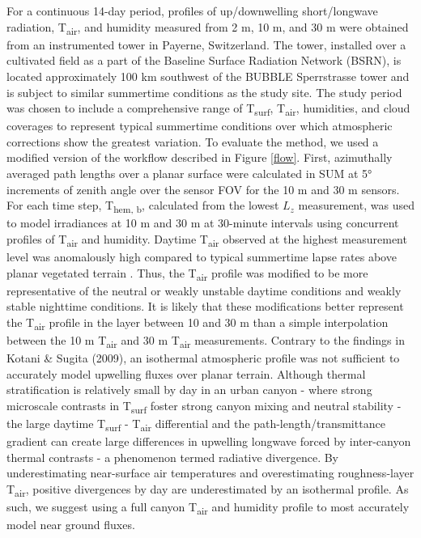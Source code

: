 For a continuous 14-day period, profiles of up/downwelling short/longwave radiation, T\textsubscript{air}, and humidity measured from 2 \si{m}, 10 \si{m}, and 30 \si{m} were obtained from an instrumented tower in Payerne, Switzerland. The tower, installed over a cultivated field as a part of the Baseline Surface Radiation Network (BSRN), is located approximately 100 \si{\kilo\meter} southwest of the BUBBLE Sperrstrasse tower and is subject to similar summertime conditions as the study site. The study period was chosen to include a comprehensive range of T\textsubscript{surf}, T\textsubscript{air}, humidities, and cloud coverages to represent typical summertime conditions over which atmospheric corrections show the greatest variation. To evaluate the method, we used a modified version of the workflow described in Figure \ref{flow}. First, azimuthally averaged path lengths over a planar surface were calculated in SUM at 5\si{\degree} increments of zenith angle over the sensor FOV for the 10 \si{\meter} and 30 \si{\meter} sensors. For each time step, T\textsubscript{hem, b}, calculated from the lowest $L_z$ measurement, was used to model irradiances at 10 \si{m} and 30 \si{m} at 30-minute intervals using concurrent profiles of T\textsubscript{air} and humidity. Daytime T\textsubscript{air} observed at the highest measurement level was anomalously high compared to typical summertime lapse rates above planar vegetated terrain \cite{Oke1987}. Thus, the T\textsubscript{air} profile was modified to be more representative of the neutral or weakly unstable daytime conditions and weakly stable nighttime conditions. It is likely that these modifications better represent the T\textsubscript{air} profile in the layer between 10 and 30 \si{\meter} than a simple interpolation between the 10 \si{\meter} T\textsubscript{air} and 30 \si{\meter} T\textsubscript{air} measurements. Contrary to the findings in Kotani \& Sugita (2009), an isothermal atmospheric profile was not sufficient to accurately model upwelling fluxes over planar terrain. Although thermal stratification is relatively small by day in an urban canyon \cite{Nakamura1988} - where strong microscale contrasts in T\textsubscript{surf} foster strong canyon mixing and neutral stability - the large daytime T\textsubscript{surf} - T\textsubscript{air} differential and the path-length/transmittance gradient can create large differences in upwelling longwave forced by inter-canyon thermal contrasts - a phenomenon termed radiative divergence. By underestimating near-surface air temperatures and overestimating roughness-layer T\textsubscript{air}, positive divergences by day are underestimated by an isothermal profile. As such, we suggest using a full canyon T\textsubscript{air} and humidity profile to most accurately model near ground fluxes.

